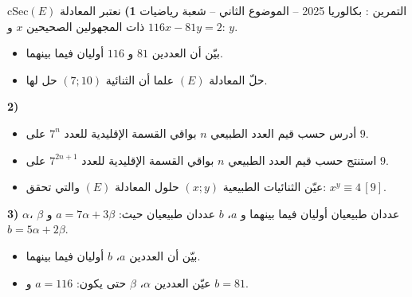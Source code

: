 \documentclass[12pt,a4paper]{article}
\newenvironment{BOX}[2]{\begin{otherlanguage}{english}\begin{arbox}{#1}{#2}}{\end{arbox}\end{otherlanguage}}
\newcounter{exo}
\newenvironment{tamrin}[1]{\stepcounter{exo}\begin{BOX}{cSec}{التمرين \theexo: #1}}{\end{BOX}}
\newenvironment{sq}{\begin{itemize}[leftmargin=2.4em,itemsep=3pt]}{\end{itemize}}
\newcommand{\qa}{\item[(أ)]}\newcommand{\qb}{\item[(ب)]}\newcommand{\qc}{\item[(جـ)]}\newcommand{\qd}{\item[(د)]}\newcommand{\qe}{\item[(هـ)]}
\begin{document}
\begin{tamrin}{بكالوريا 2025 -- الموضوع الثاني -- شعبة رياضيات}
\textbf{1)} نعتبر المعادلة $(E)$:\quad $116x-81y=2$ ذات المجهولين الصحيحين $x$ و $y$.
\begin{sq}
\qa بيّن أن العددين $81$ و $116$ أوليان فيما بينهما.
\qb حلّ المعادلة $(E)$ علما أن الثنائية $(7;10)$ حل لها.
\end{sq}
\textbf{2)}
\begin{sq}
\qa أدرس حسب قيم العدد الطبيعي $n$ بواقي القسمة الإقليدية للعدد $7^n$ على $9$.
\qb استنتج حسب قيم العدد الطبيعي $n$ بواقي القسمة الإقليدية للعدد $7^{2n+1}$ على $9$.
\qc عيّن الثنائيات الطبيعية $(x;y)$ حلول المعادلة $(E)$ والتي تحقق: $x^y\equiv4\,[9]$.
\end{sq}
\textbf{3)} $\alpha$، $\beta$ عددان طبيعيان أوليان فيما بينهما و $a$، $b$ عددان طبيعيان حيث: $a=7\alpha+3\beta$ و $b=5\alpha+2\beta$.
\begin{sq}
\qa بيّن أن العددين $a$، $b$ أوليان فيما بينهما.
\qb عيّن العددين $\alpha$، $\beta$ حتى يكون: $a=116$ و $b=81$.
\end{sq}
\end{tamrin}
\end{document}
